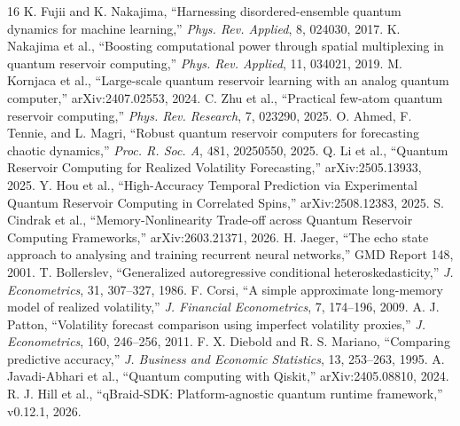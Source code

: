 \documentclass[11pt]{article}
\begin{document}
\begin{thebibliography}{16}\small
{} K. Fujii and K. Nakajima, ``Harnessing disordered-ensemble quantum dynamics for machine learning,'' \emph{Phys. Rev. Applied}, 8, 024030, 2017.
 K. Nakajima et al., ``Boosting computational power through spatial multiplexing in quantum reservoir computing,'' \emph{Phys. Rev. Applied}, 11, 034021, 2019.
 M. Kornjaca et al., ``Large-scale quantum reservoir learning with an analog quantum computer,'' arXiv:2407.02553, 2024.
 C. Zhu et al., ``Practical few-atom quantum reservoir computing,'' \emph{Phys. Rev. Research}, 7, 023290, 2025.
 O. Ahmed, F. Tennie, and L. Magri, ``Robust quantum reservoir computers for forecasting chaotic dynamics,'' \emph{Proc. R. Soc. A}, 481, 20250550, 2025.
 Q. Li et al., ``Quantum Reservoir Computing for Realized Volatility Forecasting,'' arXiv:2505.13933, 2025.
 Y. Hou et al., ``High-Accuracy Temporal Prediction via Experimental Quantum Reservoir Computing in Correlated Spins,'' arXiv:2508.12383, 2025.
 S. Cindrak et al., ``Memory-Nonlinearity Trade-off across Quantum Reservoir Computing Frameworks,'' arXiv:2603.21371, 2026.
 H. Jaeger, ``The echo state approach to analysing and training recurrent neural networks,'' GMD Report 148, 2001.
 T. Bollerslev, ``Generalized autoregressive conditional heteroskedasticity,'' \emph{J. Econometrics}, 31, 307--327, 1986.
 F. Corsi, ``A simple approximate long-memory model of realized volatility,'' \emph{J. Financial Econometrics}, 7, 174--196, 2009.
 A. J. Patton, ``Volatility forecast comparison using imperfect volatility proxies,'' \emph{J. Econometrics}, 160, 246--256, 2011.
 F. X. Diebold and R. S. Mariano, ``Comparing predictive accuracy,'' \emph{J. Business and Economic Statistics}, 13, 253--263, 1995.
 A. Javadi-Abhari et al., ``Quantum computing with Qiskit,'' arXiv:2405.08810, 2024.
 R. J. Hill et al., ``qBraid-SDK: Platform-agnostic quantum runtime framework,'' v0.12.1, 2026.
\end{thebibliography}
\end{document}
